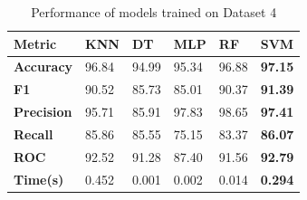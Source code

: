\begin{table}[H]
    \centering
    \caption{Performance of models trained on Dataset 4}\label{tab:performance_of_models_trained_on_dataset_4}
    \begin{tabular}{|p{5em}|C{3em}|C{3em}|C{3em}|C{3em}|C{3em}|}
        \hline
        \textbf{Metric} & \textbf{KNN} & \textbf{DT} & \textbf{MLP} & \textbf{RF} & \textbf{SVM} \\
        \hline
        \textbf{Accuracy} & 96.84 & 94.99 & 95.34 & 96.88 & \textbf{97.15} \\
        \textbf{F1} & 90.52 & 85.73 & 85.01 & 90.37 & \textbf{91.39} \\
        \textbf{Precision} & 95.71 & 85.91 & 97.83 & 98.65 & \textbf{97.41} \\
        \textbf{Recall} & 85.86 & 85.55 & 75.15 & 83.37 & \textbf{86.07} \\
        \textbf{ROC} & 92.52 & 91.28 & 87.40 & 91.56 & \textbf{92.79} \\
        \textbf{Time(s)} & 0.452 & 0.001 & 0.002 & 0.014 & \textbf{0.294} \\
        \hline
    \end{tabular}
\end{table}

